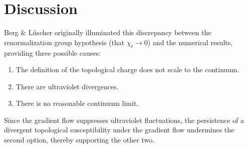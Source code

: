 \documentclass[a4paper,11pt]{article}
\begin{document}
\section{Discussion}

Berg \& L\"uscher \cite{berg1981} originally illuminated this discrepancy between the renormalization group hypothesis (that $\chi_t \rightarrow 0$) and the numerical results, providing three possible causes:
\begin{enumerate}
    \item The definition of the topological charge does not scale to the continuum.
    \item There are ultraviolet divergences.
    \item There is no reasonable continuum limit.
\end{enumerate}
Since the gradient flow suppresses ultraviolet fluctuations, the persistence of a divergent topological susceptibility under the gradient flow undermines the second option, thereby supporting the other two.





\end{document}
